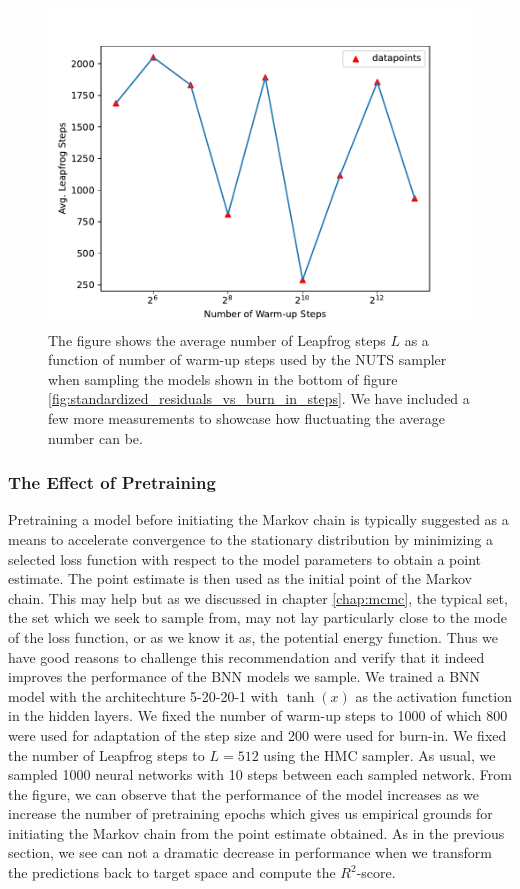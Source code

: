 \begin{figure}[h!]
    \centering
    \includegraphics[scale=0.7]{figures/standardized_residuals/effect_of_burnin/avg_burnin_steps_nuts_vs_burn_in_steps.pdf}
    \caption{The figure shows the average number of Leapfrog steps $L$ as a function of number of warm-up steps used by the NUTS sampler when sampling the models shown in the bottom of figure \ref{fig:standardized_residuals_vs_burn_in_steps}. We have included a few more measurements to showcase how fluctuating the average number can be. 
    }
    \label{fig:avg_leapfrog_steps_vs_burn_in}
\end{figure}




\subsubsection{The Effect of Pretraining}
Pretraining a model before initiating the Markov chain is typically suggested as a means to accelerate convergence to the stationary distribution by minimizing a selected loss function with respect to the model parameters to obtain a point estimate. The point estimate is then used as the initial point of the Markov chain. This may help but as we discussed in chapter \ref{chap:mcmc}, the typical set, the set which we seek to sample from, may not lay particularly close to the mode of the loss function, or as we know it as, the potential energy function. Thus we have good reasons to challenge this recommendation and verify that it indeed improves the performance of the BNN models we sample. We trained a BNN model with the architechture 5-20-20-1 with $\tanh(x)$ as the activation function in the hidden layers. We fixed the number of warm-up steps to 1000 of which 800 were used for adaptation of the step size and 200 were used for burn-in. We fixed the number of Leapfrog steps to $L = 512$ using the HMC sampler. As usual, we sampled 1000 neural networks with 10 steps between each sampled network. From the figure, we can observe that the performance of the model increases as we increase the number of pretraining epochs which gives us empirical grounds for initiating the Markov chain from the point estimate obtained. As in the previous section, we see can not a dramatic decrease in performance when we transform the predictions back to target space and compute the $R^2$-score. 


